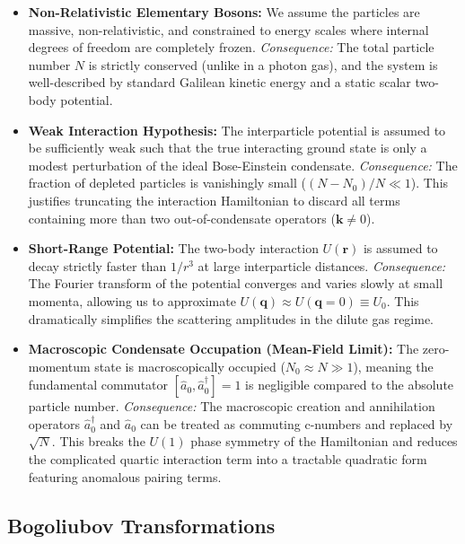 \begin{itemize}
    \item \textbf{Non-Relativistic Elementary Bosons:} We assume the particles are massive, non-relativistic, and constrained to energy scales where internal degrees of freedom are completely frozen.
          \textit{Consequence:} The total particle number \( N \) is strictly conserved (unlike in a photon gas), and the system is well-described by standard Galilean kinetic energy and a static scalar two-body potential.

    \item \textbf{Weak Interaction Hypothesis:} The interparticle potential is assumed to be sufficiently weak such that the true interacting ground state is only a modest perturbation of the ideal Bose-Einstein condensate.
          \textit{Consequence:} The fraction of depleted particles is vanishingly small (\( (N-N_0)/N \ll 1 \)). This justifies truncating the interaction Hamiltonian to discard all terms containing more than two out-of-condensate operators (\( \mathbf{k} \neq 0 \)).

    \item \textbf{Short-Range Potential:} The two-body interaction \( U(\mathbf{r}) \) is assumed to decay strictly faster than \( 1/r^3 \) at large interparticle distances.
          \textit{Consequence:} The Fourier transform of the potential converges and varies slowly at small momenta, allowing us to approximate \( U(\mathbf{q}) \approx U(\mathbf{q}=0) \equiv U_0 \). This dramatically simplifies the scattering amplitudes in the dilute gas regime.

    \item \textbf{Macroscopic Condensate Occupation (Mean-Field Limit):} The zero-momentum state is macroscopically occupied (\( N_0 \approx N \gg 1 \)), meaning the fundamental commutator \( [\hat{a}_0, \hat{a}_0^\dagger] = 1 \) is negligible compared to the absolute particle number.
          \textit{Consequence:} The macroscopic creation and annihilation operators \( \hat{a}_0^\dagger \) and \( \hat{a}_0 \) can be treated as commuting c-numbers and replaced by \( \sqrt{N} \). This breaks the \( U(1) \) phase symmetry of the Hamiltonian and reduces the complicated quartic interaction term into a tractable quadratic form featuring anomalous pairing terms.
\end{itemize}

\subsection{Bogoliubov Transformations}

